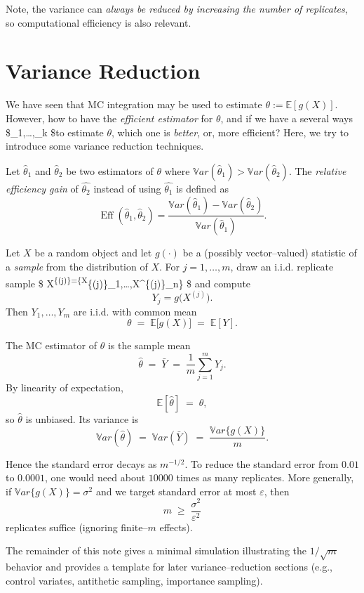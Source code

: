 \documentclass[
  letterpaper,
  DIV=11,
  numbers=noendperiod]{scrreprt}
\begin{document}
{Note, the variance can \emph{always be reduced by increasing the number
of replicates}, so computational efficiency is also relevant.

\section{Variance Reduction}\label{variance-reduction}

We have seen that MC integration may be used to estimate
\(\theta:=\mathbb{E}[g(X)]\). However, how to have the \emph{efficient
estimator } for \(\theta\), and if we have a several ways
\$\hat{\theta}\_1,\dots,\hat{\theta}\_k \$to estimate \(\theta\), which
one is \emph{better}, or, more efficient? Here, we try to introduce some
variance reduction techniques.

Let \(\hat{\theta}_1\) and \(\hat{\theta}_2\) be two estimators of
\(\theta\) where
\(\mathbb{V}ar(\hat{\theta}_1) > \mathbb{V}ar(\hat{\theta}_2)\). The
\emph{relative efficiency gain } of \(\hat{\theta_2}\) instead of using
\(\hat{\theta_1}\) is defined as \[
\operatorname{Eff}(\hat{\theta}_1, \hat{\theta}_2) = \frac{\mathbb{V}ar(\hat{\theta}_1)- \mathbb{V}ar(\hat{\theta}_2)}{\mathbb{V}ar(\hat{\theta}_1)}.
\]

Let \(X\) be a random object and let \(g(\cdot)\) be a (possibly
vector--valued) statistic of a \emph{sample} from the distribution of
\(X\). For \(j=1,\ldots,m\), draw an i.i.d. replicate sample \$
X\textsuperscript{\{(j)\}=\{X}\{(j)\}\_1,\ldots,X\^{}\{(j)\}\_n\} \$ and
compute \[
Y_j = g\!\big(X^{(j)}\big).
\tag{6.5}
\] Then \(Y_1,\ldots,Y_m\) are i.i.d. with common mean \[
\theta \;=\; \mathbb{E}\big[g(X)\big] \;=\; \mathbb{E}[Y].
\]

The MC estimator of \(\theta\) is the sample mean \[
\hat{\theta}\;=\; \bar Y \;=\; \frac{1}{m}\sum_{j=1}^m Y_j.
\] By linearity of expectation, \[
\mathbb{E}[\hat{\theta}] \;=\; \theta,
\] so \(\hat{\theta}\) is unbiased. Its variance is \[
\mathbb{V}ar(\hat{\theta})
  \;=\; \mathbb{V}ar(\bar Y)
  \;=\; \frac{\mathbb{V}ar\{g(X)\}}{m}.
\]

Hence the standard error decays as \(m^{-1/2}\). To reduce the standard
error from \(0.01\) to \(0.0001\), one would need about \(10000\) times
as many replicates. More generally, if \(\mathbb{V}ar\{g(X)\}=\sigma^2\)
and we target standard error at most \(\varepsilon\), then \[
m \;\ge\; \frac{\sigma^2}{\varepsilon^2}
\] replicates suffice (ignoring finite--\(m\) effects).

The remainder of this note gives a minimal simulation illustrating the
\(1/\sqrt{m}\) behavior and provides a template for later
variance--reduction sections (e.g., control variates, antithetic
sampling, importance sampling).

}
\end{document}
